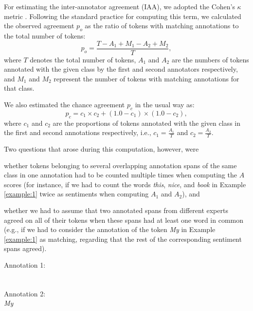 For estimating the inter-annotator agreement (IAA), we adopted the
Cohen's $\kappa$ metric \cite{Cohen:60}.  Following the standard
practice for computing this term, we calculated the observed agreement
$p_o$ as the ratio of tokens with matching annotations to the total
number of tokens:
\begin{equation*}\textstyle
  p_o = \frac{T - A_1 + M_1 - A_2 + M_2}{T},
\end{equation*}
where $T$ denotes the total number of tokens, $A_1$ and $A_2$ are the
numbers of tokens annotated with the given class by the first and
second annotators respectively, and $M_1$ and $M_2$ represent the
number of tokens with matching annotations for that class.

We also estimated the chance agreement $p_c$ in the usual way as:
\begin{equation*}\textstyle
  p_c = c_1 \times c_2 + (1.0 - c_1) \times (1.0 - c_2),
\end{equation*}
where $c_1$ and $c_2$ are the proportions of tokens annotated with the
given class in the first and second annotations respectively, i.e.,
$c_1 = \frac{A_1}{T}$ and $c_2 = \frac{A_2}{T}$.

Two questions that arose during this computation, however, were
\begin{inparaenum}
  \item whether tokens belonging to several overlapping annotation
    spans of the same class in one annotation had to be counted
    multiple times when computing the $A$ scores (for instance, if we
    had to count the words \textit{this}, \textit{nice}, and
    \textit{book} in Example \ref{example:1} twice as sentiments when
    computing $A_1$ and $A_2$), and
  \item whether we had to assume that two annotated spans from
    different experts agreed on all of their tokens when these spans
    had at least one word in common (e.g., if we had to consider the
    annotation of the token \textit{My} in Example \ref{example:1} as
    matching, regarding that the rest of the corresponding sentiment
    spans agreed).
\end{inparaenum}

{
\renewcommand{\thesection}{\arabic{section}}
\begin{example}\label{example:1}
\upshape \textup{Annotation 1:}\\\\\\ \textup{Annotation 2:}\\\itshape My\upshape
{}
\end{example}
}

